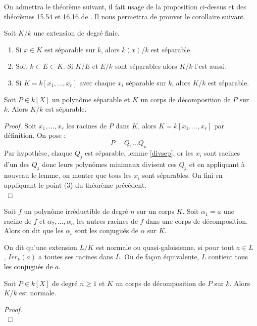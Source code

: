 \documentclass[a4paper]{article} %
\numberwithin{section}{part}
\numberwithin{equation}{section}
\begin{document}
On admettra le théorème suivant, il fait usage de la proposition ci-dessus et
des théorèmes 15.54 et 16.16 de \cite[Chap. VIII]{Pol}. Il nous permettra de
prouver le corollaire suivant.

\begin{thm}
Soit $K/k$ une extension de degré finie. 

\begin{enumerate}[(1)]
\item Si $x\in K$ est séparable sur $k$, alors $k(x)/k$ est séparable.

\item Soit $k \subset E \subset K$. Si $K/E$ et $E/k$ sont séparables alors
$K/k$ l'est aussi.

\item Si $K = k[x_1,\dots,x_r]$ avec chaque $x_i$ séparable sur $k$, alors $K/k$
est séparable.
\end{enumerate}
\end{thm}

\begin{cor}
Soit $P\in k[X]$ un polynôme séparable et $K$ un corps de
décomposition de $P$ sur $k$. Alors $K/k$ est séparable.
\end{cor}
\begin{proof}
Soit $x_1,\dots,x_r$ les racines de $P$ dans $K$, alors $K = k[x_1,\dots,x_r]$
par définition. On pose :
\[P = Q_1\dots Q_n\]
Par hypothèse, chaque $Q_j$ est séparable, lemme \ref{divsep}, or les $x_i$ sont
racines d'un des $Q_j$ donc leurs polynômes minimaux divisent ces $Q_j$ et en
appliquant à nouveau le lemme, on montre que tous les $x_i$ sont séparables. On
fini en appliquant le point (3) du théorème précédent.\\
\end{proof}

Soit $f$ un polynôme irréductible de degré $n$ sur un corps $K$. Soit $\alpha_1 
= a$ une racine de $f$ et $\alpha_2,\dots,\alpha_n$ les autres racines de $f$ 
dans une corps de décomposition. Alors on dit que les $\alpha_i$ sont les 
conjugués de $\alpha$ sur $K$.
\begin{defn}
On dit qu'une extension $L/K$ est normale ou quasi-galoisienne, si pour tout
$a\in L$, $Irr_k(a)$ a toutes ses racines dans $L$. Ou de façon équivalente, $L$
contient tous les conjugués de $a$.
\end{defn}

\begin{prop}
\label{decompnorm}
Soit $P\in k[X]$ de degré $n\geq 1$ et $K$ un corps de décomposition de $P$ sur
$k$. Alors $K/k$ est normale.
\end{prop}
\begin{proof}
\cite[Chap. VIII, p.~167]{Pol}\\
\end{proof}
\end{document}
